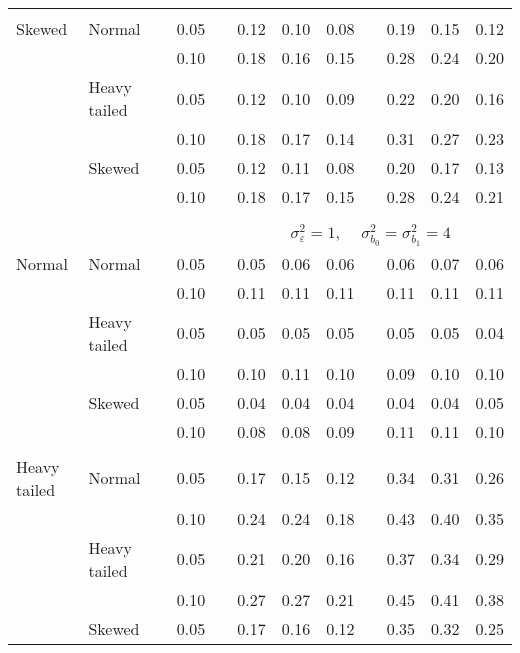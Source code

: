 \begin{table}[ht]
\begin{scriptsize}
\begin{center}
\begin{tabular}{ll p{.1cm} c p{.1cm} rrr p{.1cm} rrr}
             &&&&&&&&&&&\\
Skewed       & Normal       && 0.05 &&  0.12 & 0.10 & 0.08 && 0.19 & 0.15 & 0.12 \\ 
             &              && 0.10 &&  0.18 & 0.16 & 0.15 && 0.28 & 0.24 & 0.20 \\ 
             & Heavy tailed && 0.05 &&  0.12 & 0.10 & 0.09 && 0.22 & 0.20 & 0.16 \\ 
             &              && 0.10 &&  0.18 & 0.17 & 0.14 && 0.31 & 0.27 & 0.23 \\ 
             & Skewed       && 0.05 &&  0.12 & 0.11 & 0.08 && 0.20 & 0.17 & 0.13 \\ 
             &              && 0.10 &&  0.18 & 0.17 & 0.15 && 0.28 & 0.24 & 0.21 \\ 


&&&&&&&&&&&\\
& && && \multicolumn{7}{c}{$\sigma_{\varepsilon}^2 = 1$, \ \ $\sigma_{b_0}^2 = \sigma_{b_1}^2 = 4$} \\ \cline{6-12}
\rowcolor{gray!20}Normal       & Normal       && 0.05 &&  0.05 & 0.06 & 0.06 && 0.06 & 0.07 & 0.06 \\ 
\rowcolor{gray!20}             &              && 0.10 &&  0.11 & 0.11 & 0.11 && 0.11 & 0.11 & 0.11 \\ 
\rowcolor{gray!20}             & Heavy tailed && 0.05 &&  0.05 & 0.05 & 0.05 && 0.05 & 0.05 & 0.04 \\ 
\rowcolor{gray!20}             &              && 0.10 &&  0.10 & 0.11 & 0.10 && 0.09 & 0.10 & 0.10 \\ 
\rowcolor{gray!20}             & Skewed       && 0.05 &&  0.04 & 0.04 & 0.04 && 0.04 & 0.04 & 0.05 \\ 
\rowcolor{gray!20}             &              && 0.10 &&  0.08 & 0.08 & 0.09 && 0.11 & 0.11 & 0.10 \\ 
             &&&&&&&&&&&\\
Heavy tailed & Normal       && 0.05 &&  0.17 & 0.15 & 0.12 && 0.34 & 0.31 & 0.26 \\ 
             &              && 0.10 &&  0.24 & 0.24 & 0.18 && 0.43 & 0.40 & 0.35 \\ 
             & Heavy tailed && 0.05 &&  0.21 & 0.20 & 0.16 && 0.37 & 0.34 & 0.29 \\ 
             &              && 0.10 &&  0.27 & 0.27 & 0.21 && 0.45 & 0.41 & 0.38 \\ 
             & Skewed       && 0.05 &&  0.17 & 0.16 & 0.12 && 0.35 & 0.32 & 0.25 \\ 

\end{tabular}
\end{center}
\end{scriptsize}
\end{table}
